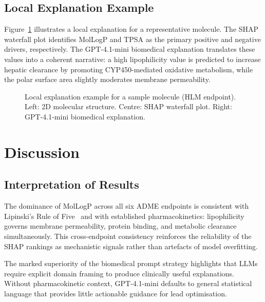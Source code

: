 \documentclass[a4paper, 11pt]{article}
\begin{document}
\subsection{Local Explanation Example}

Figure~\ref{fig:local_example} illustrates a local explanation for a
representative molecule. The SHAP waterfall plot identifies MolLogP and
TPSA as the primary positive and negative drivers, respectively. The
GPT-4.1-mini biomedical explanation translates these values into a
coherent narrative: a high lipophilicity value is predicted to increase
hepatic clearance by promoting CYP450-mediated oxidative metabolism,
while the polar surface area slightly moderates membrane permeability.

\begin{figure}[H]
  \centering
  \caption{Local explanation example for a sample molecule (HLM endpoint).
    Left: 2D molecular structure. Centre: SHAP waterfall plot. Right:
    GPT-4.1-mini biomedical explanation.}
  \label{fig:local_example}
\end{figure}


\section{Discussion}
\label{sec:discussion}

\subsection{Interpretation of Results}

The dominance of MolLogP across all six ADME endpoints is consistent with
Lipinski's Rule of Five~\cite{lipinski2001experimental} and with
established pharmacokinetics: lipophilicity governs membrane permeability,
protein binding, and metabolic clearance simultaneously. This cross-endpoint
consistency reinforces the reliability of the SHAP rankings as mechanistic
signals rather than artefacts of model overfitting.

The marked superiority of the biomedical prompt strategy highlights that
LLMs require explicit domain framing to produce clinically useful
explanations. Without pharmacokinetic context, GPT-4.1-mini defaults to
general statistical language that provides little actionable guidance for
lead optimisation.
\end{document}
